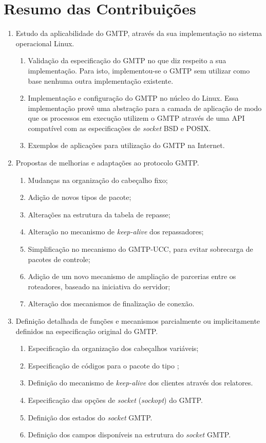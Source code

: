 \section{Resumo das Contribuições}
\begin{enumerate}
	\item Estudo da aplicabilidade do GMTP, através da sua implementação no sistema operacional Linux. 
		\begin{enumerate}
		\item Validação da especificação do GMTP no que diz respeito a sua implementação. Para isto, implementou-se o GMTP sem utilizar como base nenhuma outra implementação existente.
		\item Implementação e configuração do GMTP no núcleo do Linux. 
		Essa implementação provê uma abstração para a camada de aplicação de modo que os processos em execução utilizem o GMTP através de uma API compatível com as especificações de \textit{socket} BSD e POSIX.
		\item Exemplos de aplicações para utilização do GMTP na Internet.
	\end{enumerate}
	
	\item Propostas de melhorias e adaptações ao protocolo GMTP.
		\begin{enumerate}
			\item Mudanças na organização do cabeçalho fixo;
			\item Adição de novos tipos de pacote;
			\item Alterações na estrutura da tabela de repasse;
			\item Alteração no mecanismo de \textit{keep-alive} dos repassadores;
			\item Simplificação no mecanismo do GMTP-UCC, para evitar sobrecarga de pacotes de controle;
			\item Adição de um novo mecanismo de ampliação de parcerias entre os roteadores, baseado na iniciativa do servidor;
			\item Alteração dos mecanismos de finalização de conexão.
		\end{enumerate}
	
	\item Definição detalhada de funções e mecanismos parcialmente ou implicitamente definidos na especificação original do GMTP. 
	\begin{enumerate}
		\item Especificação da organização dos cabeçalhos variáveis;
		\item Especificação de códigos para o pacote do tipo ;
		\item Definição do mecanismo de \textit{keep-alive} dos clientes através dos relatores.
		\item Especificação das opções de \textit{socket} (\textit{sockopt}) do GMTP.
		\item Definição dos estados do \textit{socket} GMTP.
		\item Definição dos campos disponíveis na estrutura do \textit{socket} GMTP. 
	\end{enumerate}
	

\end{enumerate}
